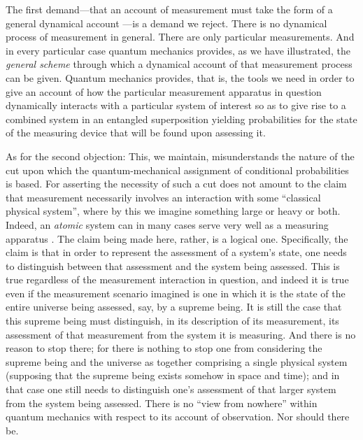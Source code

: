 The first demand---that an account of measurement must take the form of a general dynamical account \citep[cf.][]{Ghirardi 2018}---is a demand we reject. There is no dynamical process of measurement in general. There are only particular measurements. And in every particular case quantum mechanics provides, as we have illustrated, the \emph{general scheme} through which a dynamical account of that measurement process can be given. Quantum mechanics provides, that is, the tools we need in order to give an account of how the particular measurement apparatus in question dynamically interacts with a particular system of interest so as to give rise to a combined system in an entangled superposition yielding probabilities for the state of the measuring device that will be found upon assessing it.

As for the second objection: This, we maintain, misunderstands the nature of the cut upon which the quantum-mechanical assignment of conditional probabilities is based. For asserting the necessity of such a cut does not amount to the claim that measurement necessarily involves an interaction with some ``classical physical system'', where by this we imagine something large or heavy or both. Indeed, an \emph{atomic} system can in many cases serve very well as a measuring apparatus \citep[see, for instance,][]{Bacciagaluppi 2017}. The claim being made here, rather, is a logical one. Specifically, the claim is that in order to represent the assessment of a system's state, one needs to distinguish between that assessment and the system being assessed. This is true regardless of the measurement interaction in question, and indeed it is true even if the measurement scenario imagined is one in which it is the state of the entire universe being assessed, say, by a supreme being. It is still the case that this supreme being must distinguish, in its description of its measurement, its assessment of that measurement from the system it is measuring. And there is no reason to stop there; for there is nothing to stop one from considering the supreme being and the universe as together comprising a single physical system (supposing that the supreme being exists somehow in space and time); and in that case one still needs to distinguish one's assessment of that larger system from the system being assessed. There is no ``view from nowhere'' within quantum mechanics with respect to its account of observation. Nor should there be.

